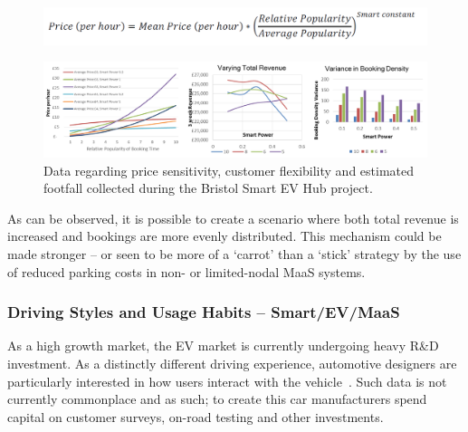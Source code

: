 \documentclass[journal]{IEEEtran}
\begin{document}
\begin{figure}[!h]
\centering
\includegraphics[width=\columnwidth]{images/smartpricingformula.png}
\label{fig:smartpricingformula}
\end{figure}

\begin{figure}[!htb]
\centering
\includegraphics[width=\textwidth]{images/smartpricegraphs.png}
\caption{Data regarding price sensitivity, customer flexibility and
estimated footfall collected during the Bristol Smart EV Hub project.}
\label{fig:smartpricegraphs}
\end{figure}


As can be observed, it is possible to create a scenario where both
total revenue is increased and bookings are more evenly
distributed. This mechanism could be made stronger -- or seen to be
more of a `carrot' than a `stick' strategy by the use of reduced
parking costs in non- or limited-nodal MaaS systems.

\subsubsection{Driving Styles and Usage Habits -- Smart/EV/MaaS} 

As a high growth market, the EV market is currently undergoing heavy
R\&D investment. As a distinctly different driving experience,
automotive designers are particularly interested in how users interact
with the vehicle~\cite{ferreira-et-al:2013}. Such data is not
currently commonplace and as such; to create this car manufacturers
spend capital on customer surveys, on-road testing and other
investments.
\end{document}
